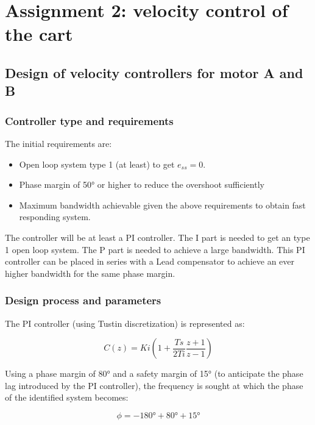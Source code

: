 \documentclass[a4paper]{article}
\newcommand{\newpar}{\vspace{.3cm}\noindent}
\begin{document}
\section{Assignment 2: velocity control of the cart}

\subsection{Design of velocity controllers for motor A and B}

\subsubsection{Controller type and requirements}

The initial requirements are:

\begin{itemize}
  \item Open loop system type 1 (at least) to get \(e_{ss} = 0\).
  \item Phase margin of 50° or higher to reduce the overshoot sufficiently
  \item Maximum bandwidth achievable given the above requirements to obtain fast responding system.
\end{itemize}

\newpar
The controller will be at least a PI controller. The I part is needed to get an type 1 open loop system. The P part is needed to achieve a large bandwidth. This PI controller can be placed in series with a Lead compensator to achieve an ever higher bandwidth for the same phase margin.

\subsubsection{Design process and parameters}

The PI controller (using Tustin discretization) is represented as:

\begin{equation}
    C(z) = Ki \left( 1 + \frac{Ts}{2Ti}\frac{z+1}{z-1}\right)
\end{equation}

\newpar
Using a phase margin of 80° and a safety margin of 15° (to anticipate the phase lag introduced by the PI controller), the frequency is sought at which the phase of the identified system becomes:

\begin{equation}
    \phi = -180° + 80° + 15°
\end{equation}
\end{document}
